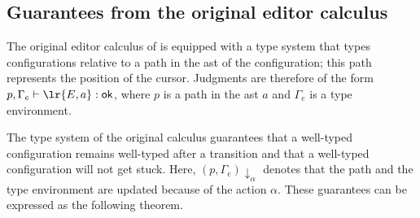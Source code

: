 \documentclass[sigplan,review]{acmart}
\begin{document}

\subsection{Guarantees from the original editor calculus}

The original editor calculus of \cite{type_safe_structure_editor} is
equipped with a type system that types configurations relative to a
path in the ast of the configuration; this path represents the
position of the cursor. Judgments are therefore of the form
$p, \Gamma_e \vdash \lr{E,a} : \textsf{ok}$, where $p$ is a path in
the ast $a$ and $\Gamma_e$ is a type environment.

The type system of the original calculus guarantees that a well-typed
configuration remains well-typed after a transition and that a
well-typed configuration will not get stuck. Here,
$(p,\Gamma_e)\downarrow_\alpha$ denotes that the path and the type
environment are updated because of the action $\alpha$. These
guarantees can be expressed as the following theorem.
\end{document}
